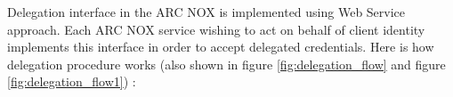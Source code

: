 \documentclass{article}                            %
\begin{document}
\begin{figure}
\end{figure}

Delegation interface in the ARC NOX is implemented using Web Service approach. Each ARC NOX service wishing to act on behalf of client identity implements this interface in order to accept delegated credentials. Here is how delegation procedure works (also shown in figure \ref{fig:delegation_flow} and figure \ref{fig:delegation_flow1}) :
\end{document}
